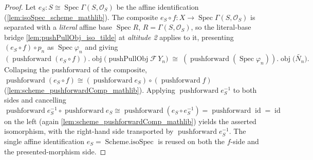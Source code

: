 \begin{proof}
  Let \(e_S : S \cong \operatorname{Spec}\Gamma(S, \mathcal{O}_S)\) be the affine identification
  (\cref{lem:isoSpec_scheme_mathlib}). The composite
  \(e_S \circ f : X \to \operatorname{Spec}\Gamma(S, \mathcal{O}_S)\) is separated with a
  \emph{literal} affine base \(\operatorname{Spec} R\), \(R = \Gamma(S, \mathcal{O}_S)\), so the
  literal-base bridge \cref{lem:pushPullObj_iso_tilde} at \emph{altitude 2} applies to it,
  presenting \((e_S \circ f) \circ p_n\) as \(\operatorname{Spec}\varphi_n\) and giving
  \[
    (\operatorname{pushforward}(e_S \circ f)).\!\operatorname{obj}\bigl(\operatorname{pushPullObj}
      \mathcal{F}\, Y_n\bigr)
    \;\cong\;
    (\operatorname{pushforward}(\operatorname{Spec}\varphi_n)).\!\operatorname{obj}\bigl(
      \widetilde{N_n}\bigr).
  \]
  Collapsing the pushforward of the composite,
  \(\operatorname{pushforward}(e_S \circ f) \cong (\operatorname{pushforward} e_S) \circ
  (\operatorname{pushforward} f)\) (\cref{lem:scheme_pushforwardComp_mathlib}). Applying
  \(\operatorname{pushforward} e_S^{-1}\) to both sides and cancelling
  \(\operatorname{pushforward} e_S^{-1} \circ \operatorname{pushforward} e_S \cong
  \operatorname{pushforward}(e_S \circ e_S^{-1}) = \operatorname{pushforward}\operatorname{id} =
  \operatorname{id}\) on the left (again \cref{lem:scheme_pushforwardComp_mathlib}) yields the
  asserted isomorphism, with the right-hand side transported by
  \(\operatorname{pushforward} e_S^{-1}\). The single affine identification
  \(e_S = \operatorname{Scheme.isoSpec}\) is reused on both the \(f\)-side and the
  presented-morphism side.
\end{proof}

